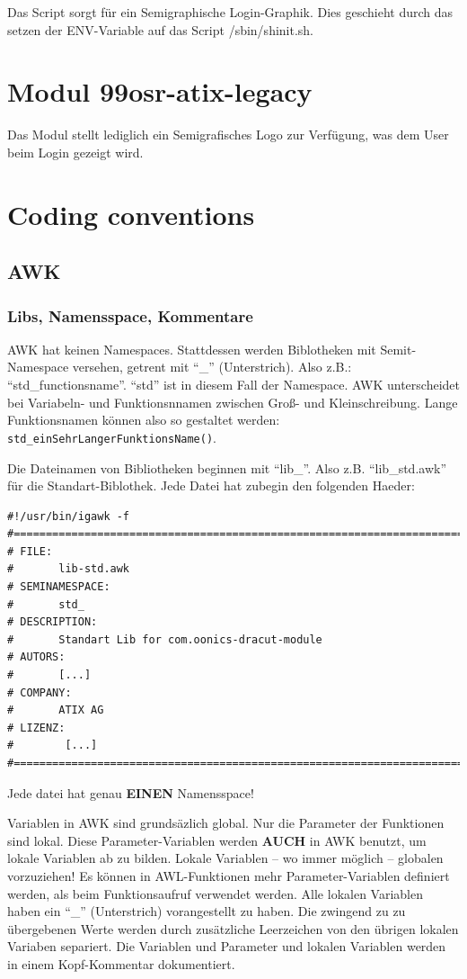 \documentclass[10pt,a4paper]{article}
\begin{document}
Das Script sorgt für ein Semigraphische Login-Graphik. Dies geschieht durch das setzen der ENV-Variable auf das Script /sbin/shinit.sh.

\section{Modul 99osr-atix-legacy}

Das Modul stellt lediglich ein Semigrafisches Logo zur Verfügung, was dem User beim Login gezeigt wird.

\section{Coding conventions}

\subsection{AWK}

\subsubsection{Libs, Namensspace, Kommentare}

AWK hat keinen Namespaces. Stattdessen werden Biblotheken mit Semit-Namespace versehen, getrent mit "`\_"' (Unterstrich). Also z.B.: "`std\_functionsname"'. "`std"' ist in diesem Fall der Namespace. AWK unterscheidet bei Variabeln- und Funktionsnnamen zwischen Groß- und Kleinschreibung. Lange Funktionsnamen können also so gestaltet werden: \texttt{std\_einSehrLangerFunktionsName()}.


Die Dateinamen von Bibliotheken beginnen mit "`lib\_"'. Also z.B. "`lib\_std.awk"' für die Standart-Biblothek. Jede Datei hat zubegin den folgenden Haeder:

\begin{verbatim}
#!/usr/bin/igawk -f
#==============================================================================
# FILE:
#       lib-std.awk
# SEMINAMESPACE:
#       std_
# DESCRIPTION:
#       Standart Lib for com.oonics-dracut-module
# AUTORS:
#       [...]
# COMPANY:
#       ATIX AG
# LIZENZ:
#        [...]
#==============================================================================
\end{verbatim}
Jede datei hat genau \textbf{EINEN} Namensspace!


\bigskip 


Variablen in AWK sind grundsäzlich global. Nur die Parameter der Funktionen sind lokal. Diese Parameter-Variablen werden \textbf{AUCH} in AWK benutzt, um lokale Variablen ab zu bilden. Lokale Variablen -- wo immer möglich -- globalen vorzuziehen! Es können in AWL-Funktionen mehr Parameter-Variablen definiert werden, als beim Funktionsaufruf verwendet werden. Alle lokalen Variablen haben ein  "`\_"' (Unterstrich) vorangestellt zu haben. Die zwingend zu zu übergebenen Werte werden durch zusätzliche Leerzeichen von den übrigen lokalen Variaben separiert. Die Variablen und Parameter und lokalen Variablen werden in einem Kopf-Kommentar dokumentiert.
\end{document}
